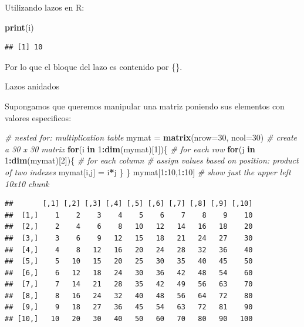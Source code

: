 \documentclass[ignorenonframetext,]{beamer}
\newenvironment{Shaded}{\begin{snugshade}}{\end{snugshade}}
\newcommand{\KeywordTok}[1]{\textcolor[rgb]{0.13,0.29,0.53}{\textbf{#1}}}
\newcommand{\DataTypeTok}[1]{\textcolor[rgb]{0.13,0.29,0.53}{#1}}
\newcommand{\DecValTok}[1]{\textcolor[rgb]{0.00,0.00,0.81}{#1}}
\newcommand{\StringTok}[1]{\textcolor[rgb]{0.31,0.60,0.02}{#1}}
\newcommand{\CommentTok}[1]{\textcolor[rgb]{0.56,0.35,0.01}{\textit{#1}}}
\newcommand{\ControlFlowTok}[1]{\textcolor[rgb]{0.13,0.29,0.53}{\textbf{#1}}}
\newcommand{\OperatorTok}[1]{\textcolor[rgb]{0.81,0.36,0.00}{\textbf{#1}}}
\newcommand{\NormalTok}[1]{#1}
\begin{document}
\begin{frame}[fragile]
\begin{block}{Utilizando lazos en R:}
\begin{Shaded}
\begin{Highlighting}[]
\KeywordTok{print}\NormalTok{(i)}
\end{Highlighting}
\end{Shaded}

\begin{verbatim}
## [1] 10
\end{verbatim}

Por lo que el bloque del lazo es contenido por \{\}.

\end{block}

\end{frame}

\begin{frame}[fragile]

\begin{block}{Lazos anidados}

Supongamos que queremos manipular una matriz poniendo sus elementos con
valores especificos:

\begin{Shaded}
\begin{Highlighting}[]
\CommentTok{# nested for: multiplication table}
\NormalTok{mymat =}\StringTok{ }\KeywordTok{matrix}\NormalTok{(}\DataTypeTok{nrow=}\DecValTok{30}\NormalTok{, }\DataTypeTok{ncol=}\DecValTok{30}\NormalTok{) }\CommentTok{# create a 30 x 30 matrix }
\ControlFlowTok{for}\NormalTok{(i }\ControlFlowTok{in} \DecValTok{1}\OperatorTok{:}\KeywordTok{dim}\NormalTok{(mymat)[}\DecValTok{1}\NormalTok{])\{}
   \CommentTok{# for each row}
   \ControlFlowTok{for}\NormalTok{(j }\ControlFlowTok{in} \DecValTok{1}\OperatorTok{:}\KeywordTok{dim}\NormalTok{(mymat)[}\DecValTok{2}\NormalTok{])\{}
      \CommentTok{# for each column}
      \CommentTok{# assign values based on position: product of two indexes}
\NormalTok{      mymat[i,j] =}\StringTok{ }\NormalTok{i}\OperatorTok{*}\NormalTok{j }
\NormalTok{   \}}
\NormalTok{\}}
\NormalTok{mymat[}\DecValTok{1}\OperatorTok{:}\DecValTok{10}\NormalTok{,}\DecValTok{1}\OperatorTok{:}\DecValTok{10}\NormalTok{] }\CommentTok{# show just the upper left 10x10 chunk}
\end{Highlighting}
\end{Shaded}

\begin{verbatim}
##       [,1] [,2] [,3] [,4] [,5] [,6] [,7] [,8] [,9] [,10]
##  [1,]    1    2    3    4    5    6    7    8    9    10
##  [2,]    2    4    6    8   10   12   14   16   18    20
##  [3,]    3    6    9   12   15   18   21   24   27    30
##  [4,]    4    8   12   16   20   24   28   32   36    40
##  [5,]    5   10   15   20   25   30   35   40   45    50
##  [6,]    6   12   18   24   30   36   42   48   54    60
##  [7,]    7   14   21   28   35   42   49   56   63    70
##  [8,]    8   16   24   32   40   48   56   64   72    80
##  [9,]    9   18   27   36   45   54   63   72   81    90
## [10,]   10   20   30   40   50   60   70   80   90   100
\end{verbatim}


\end{block}
\end{frame}
\end{document}
